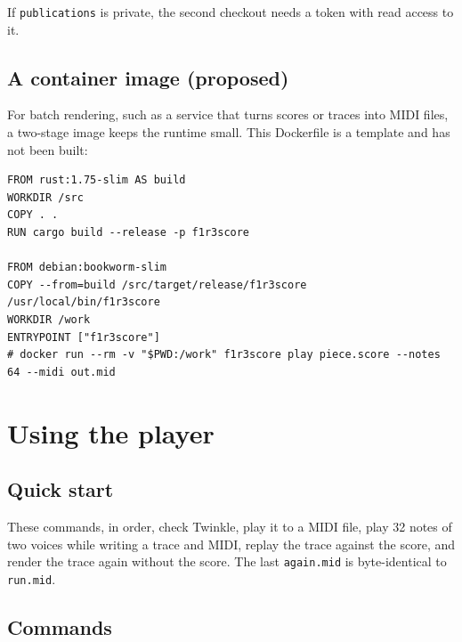 \documentclass[11pt,a4paper]{article}
\newcommand{\ttx}[1]{\texttt{#1}}
\begin{document}
\noindent If \ttx{publications} is private, the second checkout needs a token
with read access to it.

\subsection{A container image (proposed)}

For batch rendering, such as a service that turns scores or traces into MIDI
files, a two-stage image keeps the runtime small. This Dockerfile is a
template and has not been built:

\begin{lstlisting}[language={}]
FROM rust:1.75-slim AS build
WORKDIR /src
COPY . .
RUN cargo build --release -p f1r3score

FROM debian:bookworm-slim
COPY --from=build /src/target/release/f1r3score /usr/local/bin/f1r3score
WORKDIR /work
ENTRYPOINT ["f1r3score"]
# docker run --rm -v "$PWD:/work" f1r3score play piece.score --notes 64 --midi out.mid
\end{lstlisting}

\section{Using the player}\label{sec:use}

\subsection{Quick start}


\noindent These commands, in order, check Twinkle, play it to a MIDI file,
play 32 notes of two voices while writing a trace and MIDI, replay the trace
against the score, and render the trace again without the score. The last
\ttx{again.mid} is byte-identical to \ttx{run.mid}.

\subsection{Commands}
\end{document}
